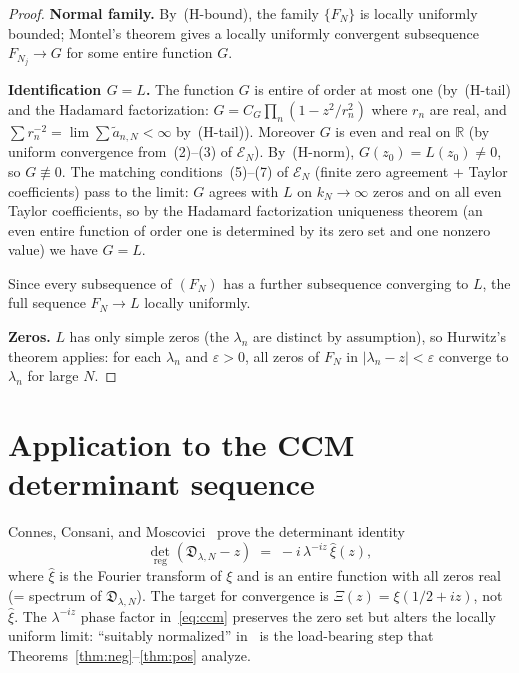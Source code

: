 \documentclass[12pt]{amsart}
\theoremstyle{definition}
\theoremstyle{remark}
\theoremstyle{plain}
\newcommand{\RR}{\mathbb{R}}
\begin{document}
\begin{proof}
\textbf{Normal family.}  By~(H-bound), the family $\{F_N\}$ is locally
uniformly bounded; Montel's theorem gives a locally uniformly convergent
subsequence $F_{N_j}\to G$ for some entire function $G$.

\textbf{Identification $G=L$.}  The function $G$ is entire of order at most
one (by~(H-tail) and the Hadamard factorization: $G=C_G\prod_n(1-z^2/r_n^2)$
where $r_n$ are real, and $\sum r_n^{-2}=\lim \sum\tilde{a}_{n,N}<\infty$
by~(H-tail)).  Moreover $G$ is even and real on $\RR$ (by uniform convergence
from~(2)--(3) of $\mathcal{E}_N$).  By~(H-norm), $G(z_0)=L(z_0)\neq 0$,
so $G\not\equiv 0$.  The matching conditions~(5)--(7) of $\mathcal{E}_N$
(finite zero agreement + Taylor coefficients) pass to the limit: $G$ agrees
with $L$ on $k_N\to\infty$ zeros and on all even Taylor coefficients, so
by the Hadamard factorization uniqueness theorem (an even entire function of
order one is determined by its zero set and one nonzero value) we have $G=L$.

Since every subsequence of $(F_N)$ has a further subsequence converging to
$L$, the full sequence $F_N\to L$ locally uniformly.

\textbf{Zeros.}  $L$ has only simple zeros (the $\lambda_n$ are distinct
by assumption), so Hurwitz's theorem applies: for each $\lambda_n$ and
$\varepsilon>0$, all zeros of $F_N$ in $|\lambda_n-z|<\varepsilon$ converge
to $\lambda_n$ for large $N$.
\end{proof}

\section{Application to the CCM determinant sequence}
\label{sec:ccm}

Connes, Consani, and Moscovici~\cite{CCM2025} prove the determinant identity
\begin{equation}
  \label{eq:ccm}
  \det_{\mathrm{reg}}(\mathfrak{D}_{\lambda,N}-z)
  \;=\; -i\,\lambda^{-iz}\,\hat{\xi}(z),
\end{equation}
where $\hat{\xi}$ is the Fourier transform of $\xi$ and is an entire function
with all zeros real (= spectrum of $\mathfrak{D}_{\lambda,N}$).
The target for convergence is $\Xi(z)=\xi(1/2+iz)$, not $\hat{\xi}$.
The $\lambda^{-iz}$ phase factor in~\eqref{eq:ccm} preserves the zero set
but alters the locally uniform limit: ``suitably normalized'' in~\cite{CCM2025}
is the load-bearing step that Theorems~\ref{thm:neg}--\ref{thm:pos} analyze.
\end{document}

